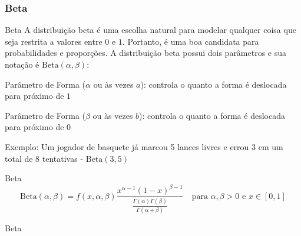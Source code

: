 \subsubsection{Beta}
\begin{frame}{Beta}
	A distribuição beta é uma escolha natural para modelar qualquer coisa
	que seja restrita a valores entre $0$ e $1$. Portanto, é uma boa candidata
	para probabilidades e proporções.
	\vfill
	A distribuição beta possui dois parâmetros e sua notação é $\text{Beta} (\alpha, \beta)$:
	\begin{vfilleditems}
		\item Parâmetro de Forma ($\alpha$ ou às vezes $a$): controla o quanto a forma é deslocada para próximo de $1$
		\item Parâmetro de Forma ($\beta$ ou às vezes $b$): controla o quanto a forma é deslocada para próximo de $0$
	\end{vfilleditems}
	\vfill
	Exemplo: Um jogador de basquete já marcou 5 lances livres e errou 3 em um
	total de 8 tentativas - $\text{Beta}(3, 5)$
\end{frame}

\begin{frame}{Beta}
	$$\text{Beta} (\alpha, \beta) = f(x, \alpha, \beta) \frac{x^{\alpha-1}(1-x)^{\beta-1}} {\frac{\Gamma (\alpha )\Gamma (\beta )}{\Gamma (\alpha +\beta )}} \quad \text{para $\alpha,\beta > 0$ e $x \in [0, 1]$}$$
\end{frame}

\begin{frame}{Beta}
	\centering
\end{frame}
